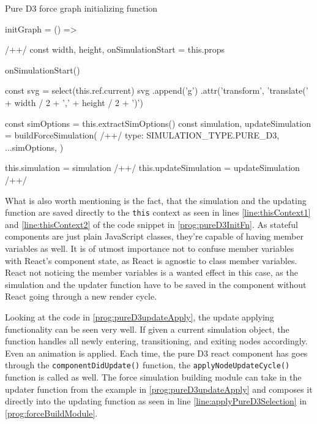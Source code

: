 \begin{program}
\caption{Pure D3 force graph initializing function}
\label{prog:pureD3InitFn}
\begin{JsCode}
initGraph = () => { /+\label{line:initGraphFn}+/
  const { width, height, onSimulationStart } = this.props

  onSimulationStart()

  const svg = select(this.ref.current)
  svg
    .append('g')
    .attr('transform', 'translate(' + width / 2 + ',' + height / 2 + ')')

  const simOptions = this.extractSimOptions()
  const { simulation, updateSimulation } = buildForceSimulation({ /+\label{line:buildForceSimulation}+/
    type: SIMULATION_TYPE.PURE_D3,
    ...simOptions,
  })

  this.simulation = simulation /+\label{line:thisContext1}+/
  this.updateSimulation = updateSimulation /+\label{line:thisContext2}+/
}
\end{JsCode}
\end{program}

What is also worth mentioning is the fact, that the simulation and the updating function are saved directly to the \texttt{this} context as seen in lines \ref{line:thisContext1} and \ref{line:thisContext2} of the code snippet in \ref{prog:pureD3InitFn}. As stateful components are just plain JavaScript classes, they're capable of having member variables as well. It is of utmost importance not to confuse member variables with React's component state, as React is agnostic to class member variables. React not noticing the member variables is a wanted effect in this case, as the simulation and the updater function have to be saved in the component without React going through a new render cycle. 

Looking at the code in \ref{prog:pureD3updateApply}, the update applying functionality can be seen very well. If given a current simulation object, the function handles all newly entering, transitioning, and exiting nodes accordingly. Even an animation is applied. Each time, the pure D3 react component has goes through the \texttt{componentDidUpdate()} function, the \texttt{applyNodeUpdateCycle()} function is called as well. The force simulation building module can take in the updater function from the example in \ref{prog:pureD3updateApply} and composes it directly into the updating function as seen in line \ref{line:applyPureD3Selection} in \ref{prog:forceBuildModule}.

